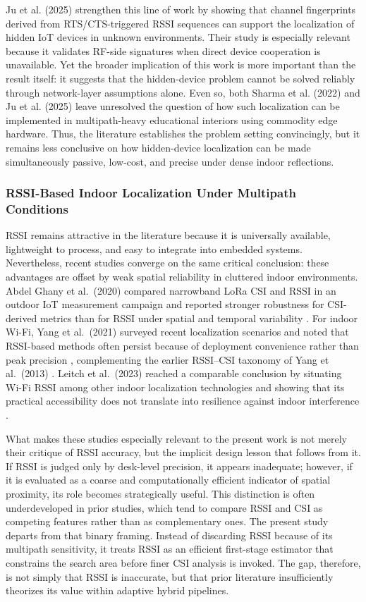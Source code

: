 Ju et al. (2025) strengthen this line of work by showing that channel fingerprints derived from RTS/CTS-triggered RSSI sequences can support the localization of hidden IoT devices in unknown environments. Their study is especially relevant because it validates RF-side signatures when direct device cooperation is unavailable. Yet the broader implication of this work is more important than the result itself: it suggests that the hidden-device problem cannot be solved reliably through network-layer assumptions alone. Even so, both Sharma et al. (2022) and Ju et al. (2025) leave unresolved the question of how such localization can be implemented in multipath-heavy educational interiors using commodity edge hardware. Thus, the literature establishes the problem setting convincingly, but it remains less conclusive on how hidden-device localization can be made simultaneously passive, low-cost, and precise under dense indoor reflections.

\subsubsection{RSSI-Based Indoor Localization Under Multipath Conditions}
RSSI remains attractive in the literature because it is universally available, lightweight to process, and easy to integrate into embedded systems. Nevertheless, recent studies converge on the same critical conclusion: these advantages are offset by weak spatial reliability in cluttered indoor environments. Abdel Ghany et al.\ (2020) compared narrowband LoRa CSI and RSSI in an outdoor IoT measurement campaign and reported stronger robustness for CSI-derived metrics than for RSSI under spatial and temporal variability \cite{ghany2020robustness}. For indoor Wi-Fi, Yang et al.\ (2021) surveyed recent localization scenarios and noted that RSSI-based methods often persist because of deployment convenience rather than peak precision \cite{yang2021survey}, complementing the earlier RSSI--CSI taxonomy of Yang et al.\ (2013) \cite{yang2013rssi2csi}. Leitch et al.\ (2023) reached a comparable conclusion by situating Wi-Fi RSSI among other indoor localization technologies and showing that its practical accessibility does not translate into resilience against indoor interference \cite{leitch2023indoor}.

What makes these studies especially relevant to the present work is not merely their critique of RSSI accuracy, but the implicit design lesson that follows from it. If RSSI is judged only by desk-level precision, it appears inadequate; however, if it is evaluated as a coarse and computationally efficient indicator of spatial proximity, its role becomes strategically useful. This distinction is often underdeveloped in prior studies, which tend to compare RSSI and CSI as competing features rather than as complementary ones. The present study departs from that binary framing. Instead of discarding RSSI because of its multipath sensitivity, it treats RSSI as an efficient first-stage estimator that constrains the search area before finer CSI analysis is invoked. The gap, therefore, is not simply that RSSI is inaccurate, but that prior literature insufficiently theorizes its value within adaptive hybrid pipelines.

